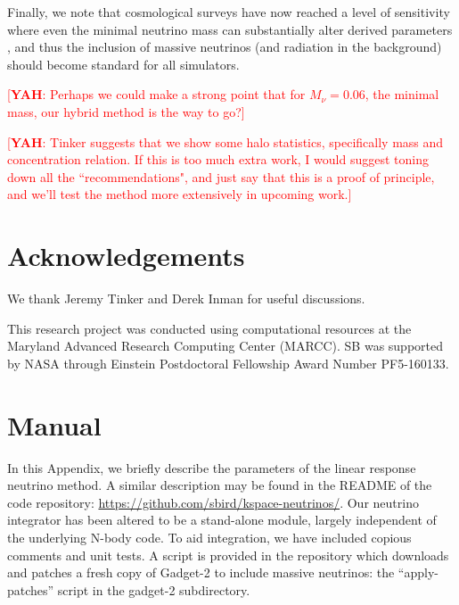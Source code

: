 \documentclass[useAMS, usenatbib]{mnras}
\newcommand{\yah}[1]{{\textcolor{red}{[{\bf YAH}: #1]}}}
\begin{document}
Finally, we note that cosmological surveys have now reached a level of sensitivity where even the minimal neutrino mass can substantially alter derived parameters \citep{Calabrese_2017}, and thus the inclusion of massive neutrinos (and radiation in the background) should become standard for all simulators.


\yah{Perhaps we could make a strong point that for $M_\nu = 0.06$, the minimal mass, our hybrid method is the way to go?}

\yah{Tinker suggests that we show some halo statistics, specifically mass and concentration relation. If this is too much extra work, I would suggest toning down all the ``recommendations", and just say that this is a proof of principle, and we'll test the method more extensively in upcoming work.}

\section*{Acknowledgements}

We thank Jeremy Tinker and Derek Inman for useful discussions.


This research project was conducted using computational resources 
at the Maryland Advanced Research Computing Center (MARCC). SB was supported by NASA through 
Einstein Postdoctoral Fellowship Award Number PF5-160133.

\appendix

\section{Manual}
\label{sec:manual}

In this Appendix, we briefly describe the parameters of the linear response neutrino method. A similar description may be found in the README of the code repository: \url{https://github.com/sbird/kspace-neutrinos/}. Our neutrino integrator has been altered to be a stand-alone module, largely independent of the underlying N-body code. To aid integration, we have included copious comments and unit tests. A script is provided in the repository which downloads and patches a fresh copy of Gadget-2 to include massive neutrinos: the ``apply-patches'' script in the gadget-2 subdirectory.
\end{document}
